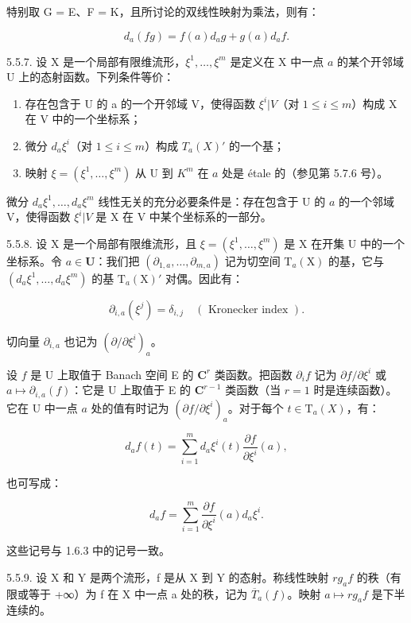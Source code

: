 特别取 G = E、F = K，且所讨论的双线性映射为乘法，则有：

\[
d _ {a} (f g) = f (a) d _ {a} g + g (a) d _ {a} f.
\]

5.5.7. 设 X 是一个局部有限维流形，\(\xi^{1},\ldots,\xi^{m}\) 是定义在 X 中一点 \(a\) 的某个开邻域 U 上的态射函数。下列条件等价：

\begin{enumerate}
\def\labelenumi{(\roman{enumi})}
\item
  存在包含于 U 的 a 的一个开邻域 V，使得函数 \(\xi^{i}|V\)（对 \(1 \leqslant i \leqslant m\)）构成 X 在 V 中的一个坐标系；
\item
  微分 \(d_a\xi^i\)（对 \(1 \leqslant i \leqslant m\)）构成 \(T_a(X)'\) 的一个基；
\item
  映射 \(\xi = (\xi^1, \ldots, \xi^m)\) 从 U 到 \(K^m\) 在 \(a\) 处是 étale 的（参见第 5.7.6 号）。
\end{enumerate}

微分 \(d_{a}\xi^{1},\ldots,d_{a}\xi^{m}\) 线性无关的充分必要条件是：存在包含于 U 的 \(a\) 的一个邻域 V，使得函数 \(\xi^{i}|V\) 是 X 在 V 中某个坐标系的一部分。

5.5.8. 设 X 是一个局部有限维流形，且 \(\xi = (\xi^1, \ldots, \xi^m)\) 是 X 在开集 U 中的一个坐标系。令 \(a \in \mathbf{U}\)：我们把 \((\partial_{1,a}, \ldots, \partial_{m,a})\) 记为切空间 \(\mathrm{T}_a(\mathrm{X})\) 的基，它与 \((d_a\xi^1, \ldots, d_a\xi^m)\) 的基 \(\mathrm{T}_a(\mathrm{X})'\) 对偶。因此有：

\[
\partial_ {i, a} (\xi^ {j}) = \delta_ {i, j} \quad (\text { Kronecker index }).
\]

切向量 \(\partial_{i,a}\) 也记为 \((\partial/\partial\xi^{i})_{a}\)。

设 \(f\) 是 U 上取值于 Banach 空间 E 的 \(\mathbf{C}^r\) 类函数。把函数 \(\partial_i f\) 记为 \(\partial f / \partial \xi^i\) 或 \(a \mapsto \partial_{i,a}(f)\)：它是 U 上取值于 E 的 \(\mathbf{C}^{r-1}\) 类函数（当 \(r = 1\) 时是连续函数）。它在 U 中一点 \(a\) 处的值有时记为 \((\partial f / \partial \xi^i)_a\)。对于每个 \(t \in \mathrm{T}_a(X)\)，有：

\[
d _ {a} f (t) = \sum_ {i = 1} ^ {m} d _ {a} \xi^ {i} (t) \frac {\partial f}{\partial \xi^ {i}} (a),
\]

也可写成：

\[
d _ {a} f = \sum_ {i = 1} ^ {m} \frac {\partial f}{\partial \xi^ {i}} (a) d _ {a} \xi^ {i}.
\]

这些记号与 1.6.3 中的记号一致。

5.5.9. 设 X 和 Y 是两个流形，f 是从 X 到 Y 的态射。称线性映射 \(rg_{a}f\) 的秩（有限或等于 +∞）为 f 在 X 中一点 a 处的秩，记为 \(\overline{T}_{a}(f)\)。映射 \(a \mapsto rg_{a}f\) 是下半连续的。

